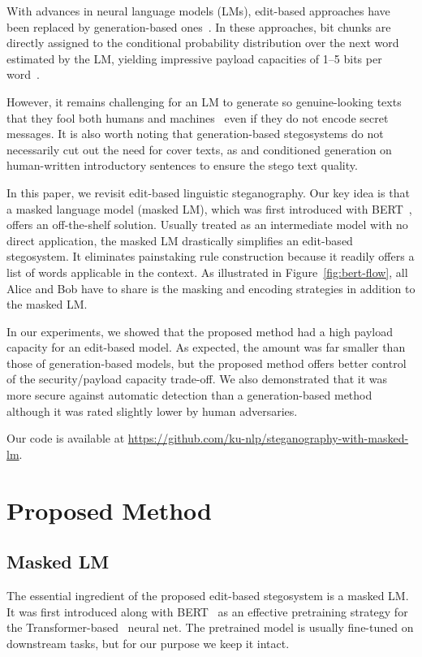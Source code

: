\documentclass[11pt]{article}
\begin{document}
With advances in neural language models (LMs), edit-based approaches have been replaced by generation-based ones~\citep{fang-etal-2017-generating,Yang:TIFS2019,dai-cai-2019-towards,ziegler-etal-2019-neural,shen-etal-2020-near}.
In these approaches, bit chunks are directly assigned to the conditional probability distribution over the next word estimated by the LM, yielding impressive payload capacities of 1--5 bits per word~\citep{shen-etal-2020-near}.

However, it remains challenging for an LM to generate so genuine-looking texts that they fool both humans and machines~\citep{ippolito-etal-2020-automatic} even if they do not encode secret messages.
It is also worth noting that generation-based stegosystems do not necessarily cut out the need for cover texts, as \citet{ziegler-etal-2019-neural} and \citet{shen-etal-2020-near} conditioned generation on human-written introductory sentences to ensure the stego text quality.

In this paper, we revisit edit-based linguistic steganography.
Our key idea is that a masked language model (masked LM), which was first introduced with BERT~\citep{devlin-etal-2019-bert}, offers an off-the-shelf solution.
Usually treated as an intermediate model with no direct application, the masked LM drastically simplifies an edit-based stegosystem.
It eliminates painstaking rule construction because it readily offers a list of words applicable in the context.
As illustrated in Figure~\ref{fig:bert-flow}, all Alice and Bob have to share is the masking and encoding strategies in addition to the masked LM.

In our experiments, we showed that the proposed method had a high payload capacity for an edit-based model.
As expected, the amount was far smaller than those of generation-based models, but the proposed method offers better control of the security/payload capacity trade-off.
We also demonstrated that it was more secure against automatic detection than a generation-based method although it was rated slightly lower by human adversaries.


Our code is available at \href{https://github.com/ku-nlp/steganography-with-masked-lm}{https://github.com/ku-nlp/steganography-with-masked-lm}.



\section{Proposed Method} \label{sec:proposed}
\subsection{Masked LM} \label{sec:proposed-mlm}
The essential ingredient of the proposed edit-based stegosystem is a masked LM.
It was first introduced along with BERT~\citep{devlin-etal-2019-bert} as an effective pretraining strategy for the Transformer-based~\citep{Vaswani:NIPS2017} neural net.
The pretrained model is usually fine-tuned on downstream tasks, but for our purpose we keep it intact.
\end{document}
